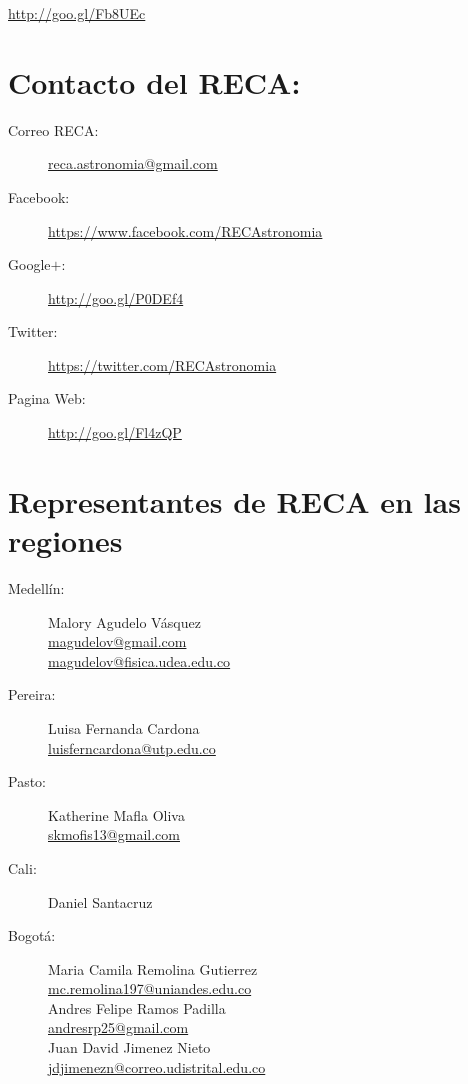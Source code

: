 \documentclass{book}
\begin{document}
\begin{center}
\url{http://goo.gl/Fb8UEc}
\end{center}


\section*{Contacto del RECA:}

\begin{description}
\item[Correo RECA:]\url{reca.astronomia@gmail.com}
\item[Facebook:] \url{https://www.facebook.com/RECAstronomia}
\item[Google$+$:] \url{http://goo.gl/P0DEf4}
\item[Twitter:] \url{https://twitter.com/RECAstronomia}
\item[Pagina Web:] \url{http://goo.gl/Fl4zQP}
\end{description}


\section*{Representantes de RECA en las regiones}
\begin{description}
\item[Medellín:]Malory Agudelo Vásquez\\
\url{magudelov@gmail.com}\\ \url{magudelov@fisica.udea.edu.co}
\item[Pereira:]Luisa Fernanda Cardona\\ \url{luisferncardona@utp.edu.co}
\item[Pasto:]Katherine Mafla Oliva\\
\url{skmofis13@gmail.com}
\item[Cali:]Daniel Santacruz
\item[Bogotá:]Maria Camila Remolina Gutierrez\\
\url{mc.remolina197@uniandes.edu.co}\\

Andres Felipe Ramos Padilla\\
\url{andresrp25@gmail.com}\\

Juan David Jimenez Nieto\\
\url{jdjimenezn@correo.udistrital.edu.co}
\end{description}
\end{document}
